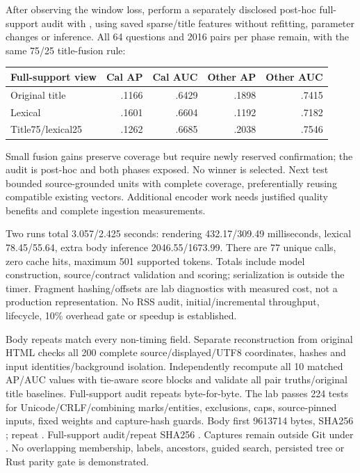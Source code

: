 \documentclass[11pt]{article}
\begin{document}
After observing the window loss, perform a separately disclosed post-hoc
full-support audit with , using saved sparse/title
features without refitting, parameter changes or inference. All 64 questions and
2016 pairs per phase remain, with the same 75/25 title-fusion rule:
\begin{center}
\begin{tabular}{lrrrr}
\toprule
Full-support view & Cal AP & Cal AUC & Other AP & Other AUC \\
\midrule
Original title & .1166 & .6429 & .1898 & .7415 \\
Lexical & .1601 & .6604 & .1192 & .7182 \\
Title75/lexical25 & .1262 & .6685 & .2038 & .7546 \\
\bottomrule
\end{tabular}
\end{center}
Small fusion gains preserve coverage but require newly reserved confirmation;
the audit is post-hoc and both phases exposed. No winner is selected. Next test
bounded source-grounded units with complete coverage, preferentially reusing
compatible existing vectors. Additional encoder work needs justified quality
benefits and complete ingestion measurements.

Two runs total 3.057/2.425 seconds: rendering 432.17/309.49 milliseconds,
lexical 78.45/55.64, extra body inference 2046.55/1673.99. There are 77 unique calls,
zero cache hits, maximum 501 supported tokens. Totals include model construction,
source/contract validation and scoring; serialization is outside the timer.
Fragment hashing/offsets are lab diagnostics with measured cost, not a production
representation. No RSS audit, initial/incremental throughput, lifecycle, 10\%
overhead gate or speedup is established.

Body repeats match every non-timing field. Separate reconstruction from original
HTML checks all 200 complete source/displayed/UTF8 coordinates, hashes and input
identities/background isolation. Independently recompute all 10 matched AP/AUC
values with tie-aware score blocks and validate all pair truths/original title
baselines. Full-support audit repeats byte-for-byte. The lab passes 224 tests for
Unicode/CRLF/combining marks/entities, exclusions, caps, source-pinned inputs,
fixed weights and capture-hash guards. Body first 9613714 bytes, SHA256
;
repeat .
Full-support audit/repeat SHA256
.
Captures remain outside Git under .
No overlapping membership, labels, ancestors, guided search, persisted tree or
Rust parity gate is demonstrated.
\end{document}
